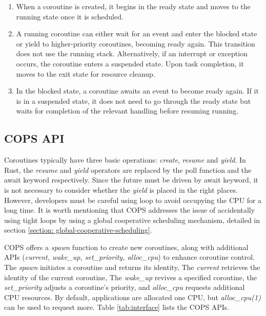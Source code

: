 \documentclass[conference]{IEEEtran}
\begin{document}
\begin{enumerate}[leftmargin=*]
    \item When a coroutine is created, it begins in the ready state and moves to the running state once it is scheduled.
    \item A running coroutine can either wait for an event and enter the blocked state or yield to higher-priority coroutines, becoming ready again. This transition does not use the running stack. Alternatively, if an interrupt or exception occurs, the coroutine enters a suspended state. Upon task completion, it moves to the exit state for resource cleanup.
    \item In the blocked state, a coroutine awaits an event to become ready again. If it is in a suspended state, it does not need to go through the ready state but waits for completion of the relevant handling before resuming running.
\end{enumerate}

\subsection{COPS API}
\label{section: cops api}

Coroutines typically have three basic operations: \textit{create}, \textit{resume} and \textit{yield}. In Rust, the \textit{resume} and \textit{yield} operators are replaced by the poll function and the await keyword respectively.
Since the future must be driven by await keyword, it is not necessary to consider whether the \textit{yield} is placed in the right places. However, developers must be careful using loop to avoid occupying the CPU for a long time. It is worth mentioning that COPS addresses the issue of accidentally using tight loops by using a global cooperative scheduling mechanism, detailed in section \ref{section: global-cooperative-scheduling}.

COPS offers a \textit{spawn} function to create new coroutines, along with additional APIs (\textit{current, wake\_up, set\_priority, alloc\_cpu}) to enhance coroutine control. The \textit{spawn} initiates a coroutine and returns its identity, The \textit{current} retrieves the identity of the current coroutine, The \textit{wake\_up} revives a specified coroutine, the \textit{set\_priority} adjusts a coroutine's priority, and \textit{alloc\_cpu} requests additional CPU resources. By default, applications are allocated one CPU, but \textit{alloc\_cpu(1)} can be used to request more. Table \ref{tab:interface} lists the COPS APIs.
\end{document}
